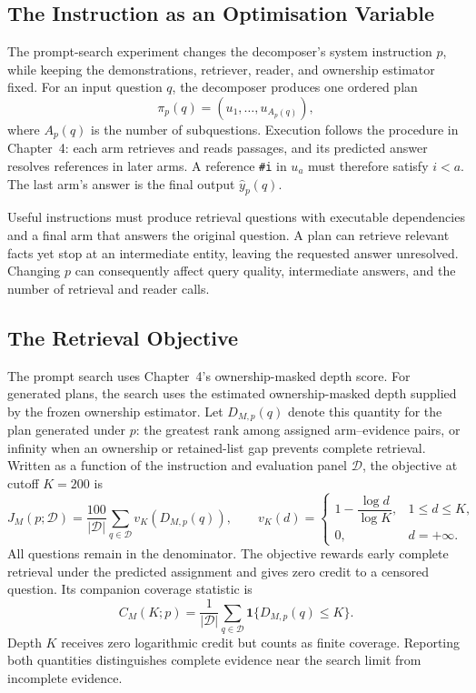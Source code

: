 \subsection{The Instruction as an Optimisation Variable}

The prompt-search experiment changes the decomposer's system instruction
$p$, while keeping the demonstrations, retriever, reader, and ownership
estimator fixed. For an input question $q$, the decomposer produces one
ordered plan
\begin{equation}
  \pi_p(q)=(u_1,\ldots,u_{A_p(q)}),
  \label{eq:ch5-plan}
\end{equation}
where $A_p(q)$ is the number of subquestions. Execution follows the procedure
in Chapter~4: each arm retrieves and reads passages, and its predicted answer
resolves references in later arms. A reference \texttt{\#i} in $u_a$ must
therefore satisfy $i<a$. The last arm's answer is the final output
$\widehat y_p(q)$.

Useful instructions must produce retrieval questions with executable
dependencies and a final arm that answers the original question. A plan can
retrieve relevant facts yet stop at an intermediate entity, leaving the
requested answer unresolved. Changing $p$ can consequently affect query
quality, intermediate answers, and the number of retrieval and reader calls.

\subsection{The Retrieval Objective}

The prompt search uses Chapter~4's ownership-masked depth score. For generated plans, the search uses the 
estimated ownership-masked depth supplied by the frozen ownership estimator. Let
$D_{M,p}(q)$ denote this quantity for the plan generated under $p$:
the greatest rank among assigned arm--evidence pairs, or infinity when an
ownership or retained-list gap prevents complete retrieval. Written as a
function of the instruction and evaluation panel $\mathcal D$, the objective
at cutoff $K=200$ is
\begin{equation}
  J_M(p;\mathcal D)=\frac{100}{|\mathcal D|}
       \sum_{q\in\mathcal D}v_K\!\left(D_{M,p}(q)\right),
  \qquad
  v_K(d)=
  \begin{cases}
     1-\dfrac{\log d}{\log K},&1\leq d\leq K,\\[1mm]
     0,&d=+\infty.
  \end{cases}
  \label{eq:ch5-objective}
\end{equation}
All questions remain in the denominator. The objective rewards early complete
retrieval under the predicted assignment and gives zero credit to a censored
question. Its companion coverage statistic is
\begin{equation}
  C_M(K;p)=\frac{1}{|\mathcal D|}\sum_{q\in\mathcal D}
             \mathbf{1}\{D_{M,p}(q)\leq K\}.
  \label{eq:ch5-coverage}
\end{equation}
Depth $K$ receives zero logarithmic credit but counts as finite coverage.
Reporting both quantities distinguishes complete evidence near the search
limit from incomplete evidence.

